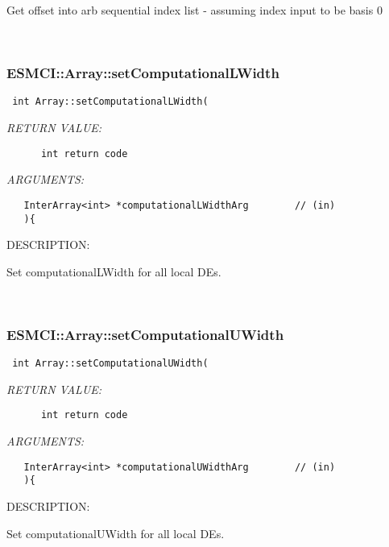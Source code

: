       Get offset into arb sequential index list - assuming index input to be
   basis 0
   
 
\mbox{}\hrulefill\
 
\subsubsection [ESMCI::Array::setComputationalLWidth] {ESMCI::Array::setComputationalLWidth}


  
\begin{verbatim} int Array::setComputationalLWidth(\end{verbatim}{\em RETURN VALUE:}
\begin{verbatim}      int return code\end{verbatim}{\em ARGUMENTS:}
\begin{verbatim}   InterArray<int> *computationalLWidthArg        // (in)
   ){\end{verbatim}
{\sf DESCRIPTION:\\ }


      Set computationalLWidth for all local DEs.
   
 
\mbox{}\hrulefill\
 
\subsubsection [ESMCI::Array::setComputationalUWidth] {ESMCI::Array::setComputationalUWidth}


  
\begin{verbatim} int Array::setComputationalUWidth(\end{verbatim}{\em RETURN VALUE:}
\begin{verbatim}      int return code\end{verbatim}{\em ARGUMENTS:}
\begin{verbatim}   InterArray<int> *computationalUWidthArg        // (in)
   ){\end{verbatim}
{\sf DESCRIPTION:\\ }


      Set computationalUWidth for all local DEs.
   
 
